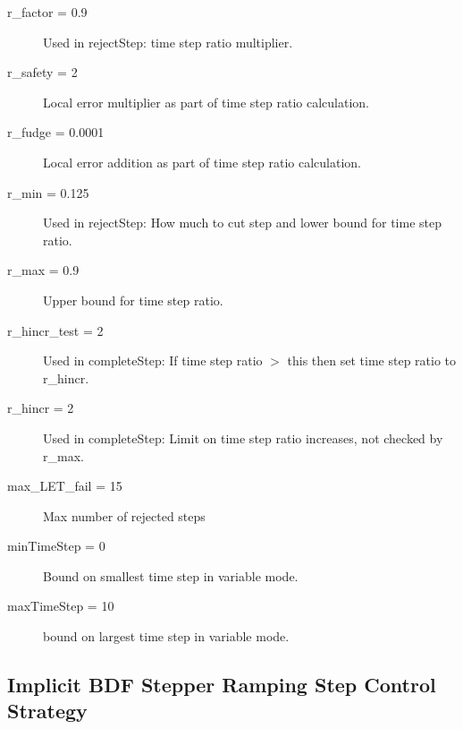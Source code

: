 \begin{list}{}
\begin{description}
      \item[r\_factor = 0.9] 
Used in rejectStep:  time step ratio multiplier.
      \item[r\_safety = 2] 
Local error multiplier as part of time step ratio calculation.
      \item[r\_fudge = 0.0001] 
Local error addition as part of time step ratio calculation.
      \item[r\_min = 0.125] 
Used in rejectStep:  How much to cut step and lower bound for time step ratio.
      \item[r\_max = 0.9] 
Upper bound for time step ratio.
      \item[r\_hincr\_test = 2] 
Used in completeStep:  If time step ratio $>$ this then set time step ratio to r\_hincr.
      \item[r\_hincr = 2] 
Used in completeStep:  Limit on time step ratio increases, not checked by r\_max.
      \item[max\_LET\_fail = 15] 
Max number of rejected steps
      \item[minTimeStep = 0] 
Bound on smallest time step in variable mode.
      \item[maxTimeStep = 10] 
bound on largest time step in variable mode.
\end{description}

\end{list}

\subsection{Implicit BDF Stepper Ramping Step Control Strategy}
\label{sec:Implicit BDF Stepper Ramping Step Control Strategy}

